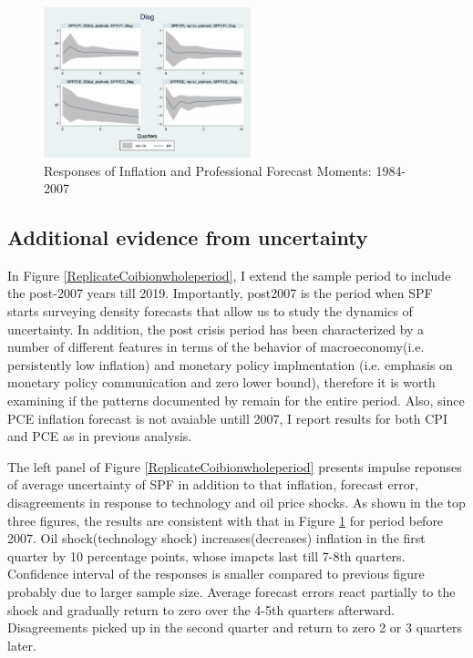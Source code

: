 \documentclass[]{article}
\begin{document}
\begin{figure}[ht]
		\includegraphics[width=6cm]{figures/SPFDisg_ab_ashocks.png} 
	\caption{Responses of Inflation and Professional Forecast Moments: 1984-2007}
	\label{ReplicateCoibionBefore2007}
\end{figure}


\subsection{Additional evidence from uncertainty}

In Figure \ref{ReplicateCoibionwholeperiod}, I extend the sample period to include the post-2007 years till 2019. Importantly, post2007 is the period when SPF starts surveying density forecasts that allow us to study the dynamics of uncertainty. In addition, the post crisis period has been characterized by a number of different features in terms of the behavior of macroeconomy(i.e. persistently low inflation) and monetary policy implmentation (i.e. emphasis on monetary policy communication and zero lower bound), therefore it is worth examining if the patterns documented by \cite{coibion2012can} remain for the entire period. Also, since PCE inflation forecast is not avaiable untill 2007, I report results for both CPI and PCE as in previous analysis. 

The left panel of  Figure \ref{ReplicateCoibionwholeperiod} presents impulse reponses of average uncertainty of SPF in addition to that inflation, forecast error, disagreements in response to technology and oil price shocks. As shown in the top three figures, the results are consistent with that in Figure \ref{ReplicateCoibionBefore2007} for period before 2007.  Oil shock(technology shock) increases(decreases) inflation in the first quarter by 10 percentage  points, whose imapcts last till 7-8th quarters. Confidence interval of the responses is smaller compared to previous figure probably due to larger sample size.  Average forecast errors react partially to the shock and gradually return to zero over the 4-5th quarters afterward. Disagreements picked up in the second quarter and return to zero 2 or 3 quarters  later. 
\end{document}
